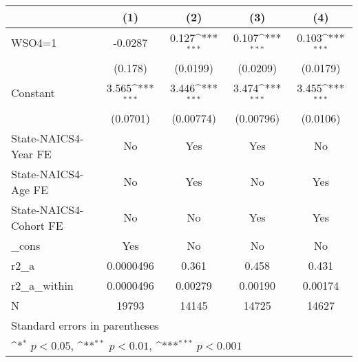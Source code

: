 {
\def\sym#1{\ifmmode^{#1}\else\(^{#1}\)\fi}
\begin{tabular}{l*{4}{c}}
\hline\hline
                    &\multicolumn{1}{c}{(1)}         &\multicolumn{1}{c}{(2)}         &\multicolumn{1}{c}{(3)}         &\multicolumn{1}{c}{(4)}         \\
\hline
WSO4=1              &     -0.0287         &       0.127\sym{***}&       0.107\sym{***}&       0.103\sym{***}\\
                    &     (0.178)         &    (0.0199)         &    (0.0209)         &    (0.0179)         \\
[1em]
Constant            &       3.565\sym{***}&       3.446\sym{***}&       3.474\sym{***}&       3.455\sym{***}\\
                    &    (0.0701)         &   (0.00774)         &   (0.00796)         &    (0.0106)         \\
[1em]
State-NAICS4-Year FE&          No         &         Yes         &         Yes         &          No         \\
[1em]
State-NAICS4-Age FE &          No         &         Yes         &          No         &         Yes         \\
[1em]
State-NAICS4-Cohort FE&          No         &          No         &         Yes         &         Yes         \\
[1em]
\_cons              &         Yes         &          No         &          No         &          No         \\
\hline
r2\_a                &   0.0000496         &       0.361         &       0.458         &       0.431         \\
r2\_a\_within         &   0.0000496         &     0.00279         &     0.00190         &     0.00174         \\
N                   &       19793         &       14145         &       14725         &       14627         \\
\hline\hline
\multicolumn{5}{l}{\footnotesize Standard errors in parentheses}\\
\multicolumn{5}{l}{\footnotesize \sym{*} \(p<0.05\), \sym{**} \(p<0.01\), \sym{***} \(p<0.001\)}\\
\end{tabular}
}
